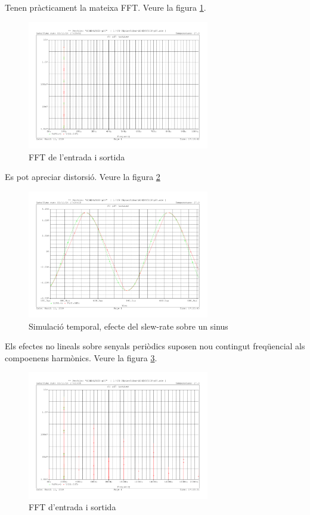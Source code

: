 \documentclass[catalan, a4paper, nobib]{tufte-handout}
\begin{document}
 Tenen pràcticament la mateixa FFT. Veure la figura \ref{fig:q8_3}.

\begin{figure}[h]
    \begin{center}
        \includegraphics[width=300px]{s2/8_2.pdf}
    \end{center}
    \caption{FFT de l'entrada i sortida}
    \label{fig:q8_3}
\end{figure}

 Es pot apreciar distorsió. Veure la figura \ref{fig:q8_4}

\begin{figure}[h]
    \begin{center}
        \includegraphics[width=300px]{s2/8_3_2.pdf}
    \end{center}
    \caption{Simulació temporal, efecte del slew-rate sobre un sinus}
    \label{fig:q8_4}
\end{figure}

 Els efectes no lineals sobre senyals periòdics suposen nou contingut freqüencial als compoenens harmònics. Veure la figura \ref{fig:q8_5}.

\begin{figure}[h]
    \begin{center}
        \includegraphics[width=300px]{s2/8_3.pdf}
    \end{center}
    \caption{FFT d'entrada i sortida}
    \label{fig:q8_5}
\end{figure}
\end{document}

